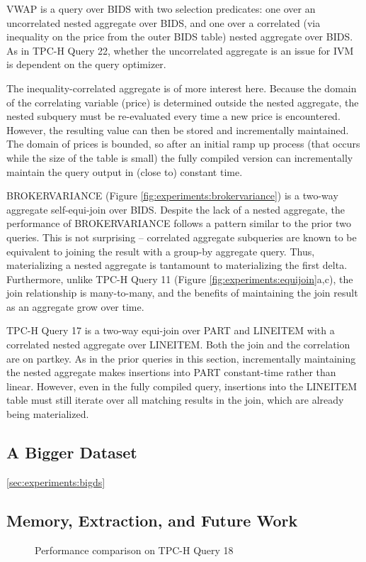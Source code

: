 VWAP is a query over BIDS with two selection predicates: one over an uncorrelated nested aggregate over BIDS, and one over a correlated (via inequality on the price from the outer BIDS table) nested aggregate over BIDS.  As in TPC-H Query 22, whether the uncorrelated aggregate is an issue for IVM is dependent on the query optimizer.  

The inequality-correlated aggregate is of more interest here.  Because the domain of the correlating variable (price) is determined outside the nested aggregate, the nested subquery must be re-evaluated every time a new price is encountered.  However, the resulting value can then be stored and incrementally maintained.  The domain of prices is bounded, so after an initial ramp up process (that occurs while the size of the table is small) the fully compiled version can incrementally maintain the query output in (close to) constant time.

BROKERVARIANCE (Figure \ref{fig:experiments:brokervariance}) is a two-way aggregate self-equi-join over BIDS.  Despite the lack of a nested aggregate, the performance of BROKERVARIANCE follows a pattern similar to the prior two queries.  This is not surprising -- correlated aggregate subqueries are known to be equivalent to joining the result with a group-by aggregate query.  Thus, materializing a nested aggregate is tantamount to materializing the first delta.  Furthermore, unlike TPC-H Query 11 (Figure \ref{fig:experiments:equijoin}a,c), the join relationship is many-to-many, and the benefits of maintaining the join result as an aggregate grow over time.

TPC-H Query 17 is a two-way equi-join over PART and LINEITEM with a correlated nested aggregate over LINEITEM.  Both the join and the correlation are on partkey.  As in the prior queries in this section, incrementally maintaining the nested aggregate makes insertions into PART constant-time rather than linear.  However, even in the fully compiled query, insertions into the LINEITEM table must still iterate over all matching results in the join, which are already being materialized.  

\subsection{A Bigger Dataset}
\ref{sec:experiments:bigds}


\subsection{Memory, Extraction, and Future Work}
\label{sec:experiments:future}
\begin{figure}
\begin{center}
\caption{Performance comparison on TPC-H Query 18}
\label{fig:experiments:tpch18}
\end{center}
\end{figure}

